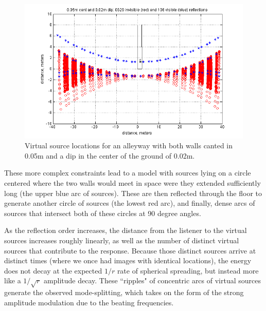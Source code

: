 \documentclass{aes137}
\begin{document}
\begin{figure}[h!] \centering \includegraphics[width=\linewidth, trim=13mm 2mm 10mm 3mm, clip]{images/ISM_0pt05m_cant_0pt02m_dip.png} 
\caption{Virtual source locations for an alleyway with both walls canted in 0.05m and a dip in the center of the ground of 0.02m.} 
\end{figure}

These more complex constraints lead to a model with sources lying on a
circle centered where the two walls would meet in space were they
extended sufficiently long (the upper blue arc of sources). These are then reflected through the floor to generate another circle of sources (the lowest red arc), and finally, dense arcs of sources that intersect
both of these circles at 90 degree angles.

As the reflection order increases, the distance from the listener to the virtual sources increases roughly linearly, as well as the number of distinct virtual sources that contribute to the response. Because those distinct sources arrive at distinct times (where we once had images with identical locations), the energy does not decay at the expected $1/r$ rate of spherical spreading, but instead more like a $1/\sqrt{r}$ amplitude decay. %
These ``ripples" of concentric arcs of virtual sources generate the observed mode-splitting, which takes on the form of the strong amplitude modulation due to the beating frequencies.


\end{document}
